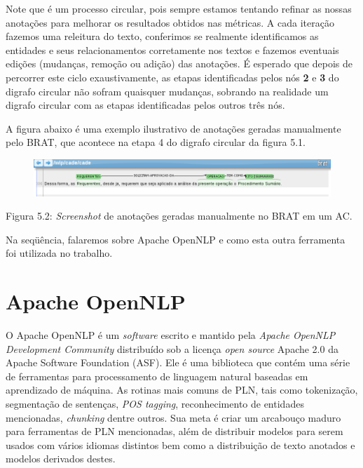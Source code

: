 \documentclass[11pt]{report}
\begin{document}
Note que é um processo circular, pois sempre estamos tentando refinar as nossas anotações para melhorar os resultados obtidos nas métricas. A cada iteração
fazemos uma releitura do texto, conferimos se realmente identificamos as entidades e seus relacionamentos corretamente nos textos e fazemos eventuais edições
(mudanças, remoção ou adição) das anotações. É esperado que depois de percorrer este ciclo exaustivamente, as etapas identificadas pelos nós \textbf{2} e \textbf{3}
do digrafo circular não sofram quaisquer mudanças, sobrando na realidade um digrafo circular com as etapas identificadas pelos outros três nós.

A figura abaixo é uma exemplo ilustrativo de anotações geradas manualmente pelo BRAT, que acontece na etapa 4 do digrafo circular da figura 5.1.
\begin{figure}[h!]
  \hspace*{-1.8cm}
  \includegraphics[scale=0.59]{brat}
\end{figure}

\begin{center}
  Figura 5.2: \textit{Screenshot} de anotações geradas manualmente no BRAT em um AC.
\end{center}

Na seqüência, falaremos sobre Apache OpenNLP e como esta outra ferramenta foi utilizada no trabalho.

\section{Apache OpenNLP}

\indent\indent O Apache OpenNLP é um \textit{software} escrito e mantido pela \textit{Apache OpenNLP Development Community} distribuído sob a licença \textit{open source}
Apache 2.0 da Apache Software Foundation (ASF). Ele é uma biblioteca que contém uma série de ferramentas para processamento de linguagem natural baseadas em aprendizado
de máquina. As rotinas mais comuns de PLN, tais como tokenização, segmentação de sentenças, \textit{POS tagging}, reconhecimento de entidades mencionadas, \textit{chunking} 
dentre outros. Sua meta é criar um arcabouço maduro para ferramentas de PLN mencionadas, além de distribuir modelos para serem usados com vários idiomas distintos bem como
a distribuição de texto anotados e modelos derivados destes. 
\end{document}
